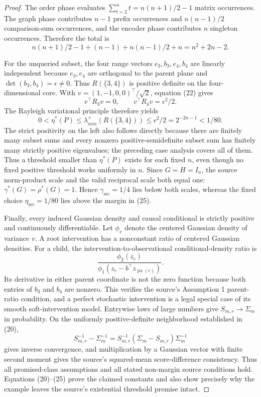 \documentclass{article}
\begin{document}
\begin{proof}
The order phase evaluates \(\sum_{t=2}^nt=n(n+1)/2-1\) matrix occurrences.  The graph phase contributes \(n-1\) prefix occurrences and \(n(n-1)/2\) comparison-sum occurrences, and the encoder phase contributes \(n\) singleton occurrences.  Therefore the total is
\[
 n(n+1)/2-1+(n-1)+n(n-1)/2+n=n^2+2n-2.
 \tag{24}
\]

For the unqueried subset, the four range vectors \(e_3,b_3,e_4,b_4\) are linearly independent because \(e_3,e_4\) are orthogonal to the parent plane and \(\det(b_3,b_4)=\epsilon\ne0\).  Thus \(R(\{3,4\})\) is positive definite on the four-dimensional core.  With \(v=(1,-1,0,0)^{\top}/\sqrt2\), equation (22) gives
\[
 v^{\top}R_3v=0,
 \qquad
 v^{\top}R_4v=\epsilon^2/2.
\]
The Rayleigh variational principle therefore yields
\[
 0<\eta^{\ast}(P)
 \le\lambda_{min}^{+}(R(\{3,4\}))
 \le\epsilon^2/2=2^{-2n-1}<1/80.
 \tag{25}
\]
The strict positivity on the left also follows directly because there are finitely many subset sums and every nonzero positive-semidefinite subset sum has finitely many strictly positive eigenvalues; the preceding case analysis covers all of them.  Thus a threshold smaller than \(\eta^{\ast}(P)\) exists for each fixed \(n\), even though no fixed positive threshold works uniformly in \(n\).  Since \(G=H=I_n\), the source norm-product scale and the valid reciprocal scale both equal one: \(\gamma^{\ast}(G)=\rho^{\ast}(G)=1\).  Hence \(\gamma_{\mathrm{src}}=1/4\) lies below both scales, whereas the fixed choice \(\eta_{\mathrm{src}}=1/80\) lies above the margin in (25).

Finally, every induced Gaussian density and causal conditional is strictly positive and continuously differentiable.  Let \(\phi_v\) denote the centered Gaussian density of variance \(v\).  A root intervention has a nonconstant ratio of centered Gaussian densities.  For a child, the intervention-to-observational conditional-density ratio is
\[
 \frac{\phi_2(z_c)}{\phi_1(z_c-b^{\top}z_{\operatorname{pa}(c)})}.
\]
Its derivative in either parent coordinate is not the zero function because both entries of \(b_3\) and \(b_4\) are nonzero.  This verifies the source's Assumption 1 parent-ratio condition, and a perfect stochastic intervention is a legal special case of its smooth soft-intervention model.  Entrywise laws of large numbers give \(S_{m,r}\to\Sigma_m\) in probability.  On the uniformly positive-definite neighborhood established in (20),
\[
 S_{m,r}^{-1}-\Sigma_m^{-1}
 =S_{m,r}^{-1}(\Sigma_m-S_{m,r})\Sigma_m^{-1}
\]
gives inverse convergence, and multiplication by a Gaussian vector with finite second moment gives the source's squared-mean score-difference consistency.  Thus all promised-class assumptions and all stated non-margin source conditions hold.  Equations (20)--(25) prove the claimed constants and also show precisely why the example leaves the source's existential threshold premise intact.
\end{proof}
\end{document}
